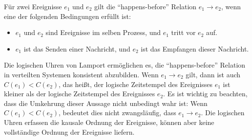 \documentclass[../vs-script-first-v01.tex]{subfiles}
\begin{document}
Für zwei Ereignisse $e_1$ und $e_2$ gilt die \enquote{happens-before} Relation $e_1 \to e_2$, wenn eine der folgenden Bedingungen erfüllt ist:
\begin{itemize}
\item $e_1$ und $e_2$ sind Ereignisse im selben Prozess, und $e_1$ tritt vor $e_2$ auf.
\item $e_1$ ist das Senden einer Nachricht, und $e_2$ ist das Empfangen dieser Nachricht.
\end{itemize}  
Die logischen Uhren von Lamport ermöglichen es, die \enquote{happens-before} Relation in verteilten Systemen konsistent abzubilden. Wenn $e_1 \to e_2$ gilt, dann ist auch $C(e_1) < C(e_2)$, das heißt, der logische Zeitstempel des Ereignisses $e_1$ ist kleiner als der logische Zeitstempel des Ereignisses $e_2$. Es ist wichtig zu beachten, dass die Umkehrung dieser Aussage nicht unbedingt wahr ist: Wenn $C(e_1) < C(e_2)$, bedeutet dies nicht zwangsläufig, dass $e_1 \to e_2$. Die logischen Uhren erfassen die kausale Ordnung der Ereignisse, können aber keine vollständige Ordnung der Ereignisse liefern.
\end{document}
